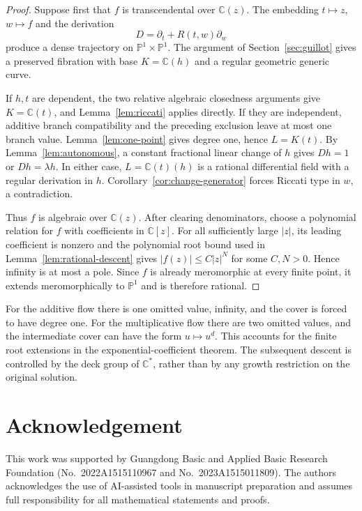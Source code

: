 \documentclass[11pt,reqno]{amsart}
\numberwithin{equation}{section}
\theoremstyle{definition}
\theoremstyle{remark}
\newcommand{\C}{\mathbb C}
\newcommand{\PP}{\mathbb P}
\begin{document}
\begin{proof}
Suppose first that $f$ is transcendental over $\C(z)$. The
embedding $t\mapsto z$, $w\mapsto f$ and the derivation
\[
 D=\partial_t+R(t,w)\partial_w
\]
produce a dense trajectory on $\PP^1\times\PP^1$. The argument
of Section~\ref{sec:guillot} gives a preserved fibration with base
$K=\C(h)$ and a regular geometric generic curve.

If $h,t$ are dependent, the two relative algebraic closedness
arguments give $K=\C(t)$, and Lemma~\ref{lem:riccati} applies
directly. If they are independent, additive branch compatibility
and the preceding exclusion leave at most one branch value.
Lemma~\ref{lem:one-point} gives degree one, hence $L=K(t)$.
By Lemma~\ref{lem:autonomous}, a constant fractional linear change
of $h$ gives $Dh=1$ or $Dh=\lambda h$. In either case,
$L=\C(t)(h)$ is a rational differential field with a regular
derivation in $h$. Corollary~\ref{cor:change-generator} forces
Riccati type in $w$, a contradiction.

Thus $f$ is algebraic over $\C(z)$. After clearing denominators, choose
a polynomial relation for $f$ with coefficients in $\C[z]$. For all
sufficiently large $|z|$, its leading coefficient is nonzero and the
polynomial root bound used in Lemma~\ref{lem:rational-descent} gives
$|f(z)|\leq C|z|^N$ for some $C,N>0$. Hence infinity is at most a pole.
Since $f$ is already meromorphic at every finite point, it extends
meromorphically to $\PP^1$ and is therefore rational.
\end{proof}

For the additive flow there is one omitted value, infinity, and the
cover is forced to have degree one. For the multiplicative flow
there are two omitted values, and the intermediate cover can have
the form $u\mapsto u^d$. This accounts for the finite root
extensions in the exponential-coefficient theorem. The subsequent
descent is controlled by the deck group of $\C^*$, rather than by
any growth restriction on the original solution.

\enlargethispage{3\baselineskip}



\section*{Acknowledgement}
This work was supported by Guangdong Basic and Applied Basic Research Foundation
(No.~2022A1515110967 and No.~2023A1515011809). The authors acknowledges the use of AI-assisted tools in manuscript preparation and assumes full responsibility for all mathematical statements and proofs.
\end{document}
